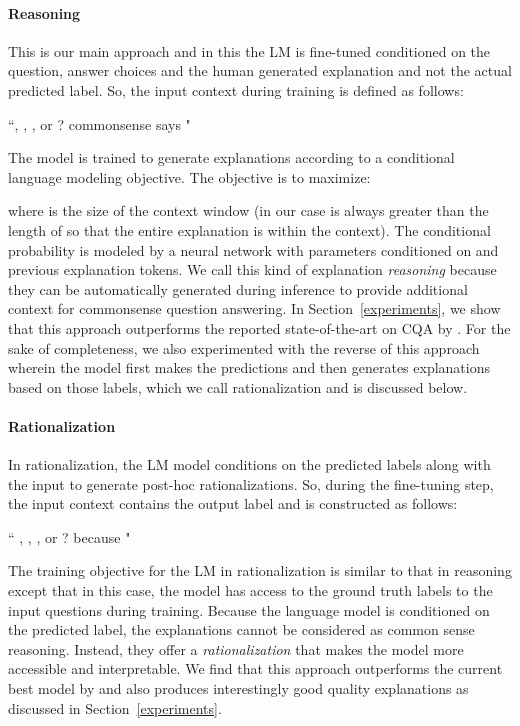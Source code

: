 \documentclass[11pt,a4paper]{article}
\begin{document}
\paragraph{Reasoning}
This is our main approach and in this the LM is fine-tuned conditioned on the question, answer choices and the human generated explanation and not the actual predicted label. So, the input context during training is defined as follows:
\begin{center}
 ``, , , or ? commonsense says "
\end{center}
\noindent
The model is trained to generate explanations  according to a conditional language modeling objective.  The objective is to maximize:

\noindent
where  is the size of the context window (in our case  is always greater than the length of  so that the entire explanation is within the context). 
The conditional probability  is modeled by a neural network with parameters  conditioned on  and previous explanation tokens.
We call this kind of explanation {\it reasoning} because they can be automatically generated during inference to provide additional context for commonsense question answering. In Section~\ref{experiments}, we show that this approach outperforms the reported state-of-the-art on CQA by .
For the sake of completeness, we also experimented with the reverse of this approach wherein the model first makes the predictions and then generates explanations based on those labels, which we call rationalization and is discussed below.

\paragraph{Rationalization}
In rationalization, the LM model conditions on the predicted labels along with the input to generate post-hoc rationalizations. So, during the fine-tuning step, the input context contains the output label and is constructed as follows:
\begin{center}
 `` , , , or ?  because "
\end{center}
The training objective for the LM in rationalization is similar to that in reasoning except that in this case, the model has access to the ground truth labels to the input questions during training.
Because the language model is conditioned on the predicted label, 
the explanations cannot be considered as common sense reasoning. Instead, they offer a {\it rationalization} that makes the model more accessible and interpretable. 
We find that this approach outperforms the current best model by  and also produces interestingly good quality explanations as discussed in Section~\ref{experiments}.
\end{document}
